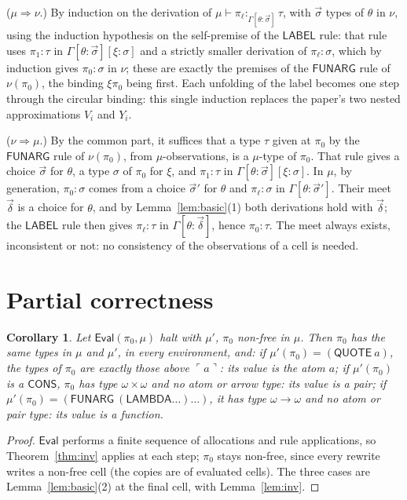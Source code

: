 \documentclass[11pt]{amsart}
\newtheorem{corollary}[theorem]{Corollary}
\theoremstyle{definition}
\theoremstyle{remark}
\newcommand{\kw}[1]{\mathsf{#1}}
\newcommand{\at}[1]{\ulcorner #1\urcorner}
\newcommand{\obs}[4]{#1\vdash #2:_{#3}#4}
\begin{document}
($\mu\Rightarrow\nu$.) By induction on the derivation of
$\obs\mu{\pi_\ell}{\Gamma[\theta:\vec\sigma]}\tau$, with $\vec\sigma$ types of
$\theta$ in $\nu$, using the induction hypothesis on the self-premise of the
$\kw{LABEL}$ rule: that rule uses
$\pi_1:\tau$ in $\Gamma[\theta:\vec\sigma][\xi:\sigma]$ and a strictly smaller
derivation of $\pi_\ell:\sigma$, which by induction gives $\pi_0:\sigma$ in $\nu$;
these are exactly the premises of the $\kw{FUNARG}$ rule of $\nu(\pi_0)$, the
binding $\xi\pi_0$ being first. Each unfolding of the label becomes one step
through the circular binding: this single induction replaces the paper's two
nested approximations $V_i$ and $Y_i$.

($\nu\Rightarrow\mu$.) By the common part, it suffices that a type $\tau$
given at $\pi_0$ by the $\kw{FUNARG}$ rule of $\nu(\pi_0)$, from
$\mu$-observations, is a $\mu$-type of $\pi_0$. That rule gives a choice
$\vec\sigma$ for $\theta$, a type $\sigma$ of $\pi_0$ for $\xi$, and $\pi_1:\tau$ in
$\Gamma[\theta:\vec\sigma][\xi:\sigma]$. In $\mu$, by generation, $\pi_0:\sigma$
comes from a choice $\vec\sigma'$ for $\theta$ and $\pi_\ell:\sigma$ in
$\Gamma[\theta:\vec\sigma']$. Their meet $\vec\delta$ is a choice for $\theta$, and by
Lemma~\ref{lem:basic}(1) both derivations hold with $\vec\delta$; the $\kw{LABEL}$
rule then gives $\pi_\ell:\tau$ in $\Gamma[\theta:\vec\delta]$, hence $\pi_0:\tau$.
The meet always exists, inconsistent or not: no consistency of the
observations of a cell is needed.

\section{Partial correctness}

\begin{corollary}\label{cor:pc}
Let $\kw{Eval}(\pi_0,\mu)$ halt with $\mu'$, $\pi_0$ non-free in $\mu$. Then
$\pi_0$ has the same types in $\mu$ and $\mu'$, in every environment, and:
if $\mu'(\pi_0)=(\kw{QUOTE}\ a)$, the types of $\pi_0$ are exactly those above
$\at a$: its value is the atom $a$;
if $\mu'(\pi_0)$ is a $\kw{CONS}$, $\pi_0$ has type $\omega\times\omega$ and no
atom or arrow type: its value is a pair;
if $\mu'(\pi_0)=(\kw{FUNARG}\ (\kw{LAMBDA}\dots)\dots)$, it has type
$\omega\to\omega$ and no atom or pair type: its value is a function.
\end{corollary}

\begin{proof}
$\kw{Eval}$ performs a finite sequence of allocations and rule
applications, so Theorem~\ref{thm:inv} applies at each step; $\pi_0$ stays
non-free, since every rewrite writes a non-free cell (the copies are of
evaluated cells). The three cases are Lemma~\ref{lem:basic}(2) at the final
cell, with Lemma~\ref{lem:inv}.
\end{proof}
\end{document}

